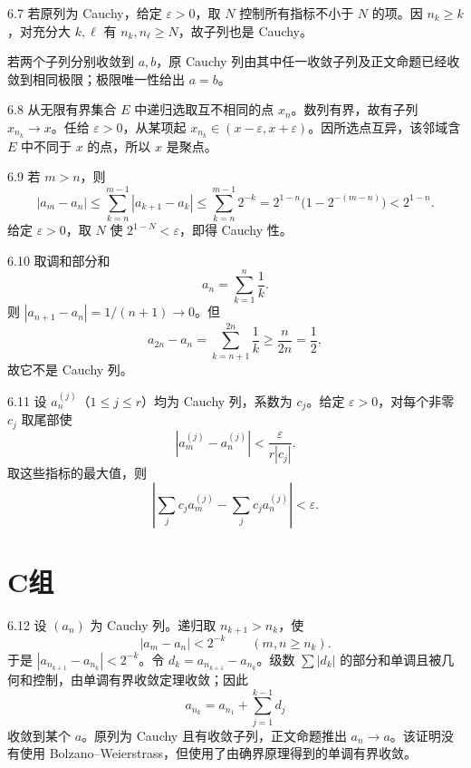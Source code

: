 \begin{solution}{6.7}
若原列为 Cauchy，给定 \(\varepsilon>0\)，取 \(N\) 控制所有指标不小于 \(N\) 的项。因 \(n_k\ge k\)，对充分大 \(k,\ell\) 有 \(n_k,n_\ell\ge N\)，故子列也是 Cauchy。

若两个子列分别收敛到 \(a,b\)，原 Cauchy 列由其中任一收敛子列及正文命题已经收敛到相同极限；极限唯一性给出 \(a=b\)。
\end{solution}

\begin{solution}{6.8}
从无限有界集合 \(E\) 中递归选取互不相同的点 \(x_n\)。数列有界，故有子列 \(x_{n_k}\to x\)。任给 \(\varepsilon>0\)，从某项起 \(x_{n_k}\in(x-\varepsilon,x+\varepsilon)\)。因所选点互异，该邻域含 \(E\) 中不同于 \(x\) 的点，所以 \(x\) 是聚点。
\end{solution}

\begin{solution}{6.9}
若 \(m>n\)，则
\[
 |a_m-a_n|\le\sum_{k=n}^{m-1}|a_{k+1}-a_k|
 \le\sum_{k=n}^{m-1}2^{-k}
 =2^{1-n}\bigl(1-2^{-(m-n)}\bigr)<2^{1-n}.
\]
给定 \(\varepsilon>0\)，取 \(N\) 使 \(2^{1-N}<\varepsilon\)，即得 Cauchy 性。
\end{solution}

\begin{solution}{6.10}
取调和部分和
\[
 a_n=\sum_{k=1}^n\frac1k.
\]
则 \(|a_{n+1}-a_n|=1/(n+1)\to0\)。但
\[
 a_{2n}-a_n=\sum_{k=n+1}^{2n}\frac1k\ge\frac n{2n}=\frac12,
\]
故它不是 Cauchy 列。
\end{solution}

\begin{solution}{6.11}
设 \(a^{(j)}_n\)（\(1\le j\le r\)）均为 Cauchy 列，系数为 \(c_j\)。给定 \(\varepsilon>0\)，对每个非零 \(c_j\) 取尾部使
\[
 |a^{(j)}_m-a^{(j)}_n|<\frac{\varepsilon}{r|c_j|}.
\]
取这些指标的最大值，则
\[
 \left|\sum_jc_ja^{(j)}_m-\sum_jc_ja^{(j)}_n\right|<\varepsilon.
\]
\end{solution}

\section*{C组}

\begin{solution}{6.12}
设 \((a_n)\) 为 Cauchy 列。递归取 \(n_{k+1}>n_k\)，使
\[
 |a_m-a_n|<2^{-k}\qquad(m,n\ge n_k).
\]
于是 \(|a_{n_{k+1}}-a_{n_k}|<2^{-k}\)。令 \(d_k=a_{n_{k+1}}-a_{n_k}\)。级数 \(\sum|d_k|\) 的部分和单调且被几何和控制，由单调有界收敛定理收敛；因此
\[
 a_{n_k}=a_{n_1}+\sum_{j=1}^{k-1}d_j
\]
收敛到某个 \(a\)。原列为 Cauchy 且有收敛子列，正文命题推出 \(a_n\to a\)。该证明没有使用 Bolzano--Weierstrass，但使用了由确界原理得到的单调有界收敛。
\end{solution}

